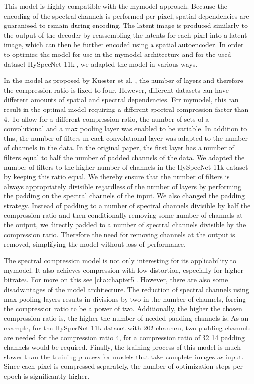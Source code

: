 This model is highly compatible with the \ac{mymodel} approach. Because the encoding of the spectral channels is performed per pixel, spatial dependencies are guaranteed to remain during encoding. The latent image is produced similarly to the output of the decoder by reassembling the latents for each pixel into a latent image, which can then be further encoded using a spatial autoencoder. In order to optimize the model for use in the \ac{mymodel} architecture and for the used dataset HySpecNet-11k \citep{fuchs_hyspecnet-11k_2023}, we adapted the model in various ways.

In the model as proposed by Kuester et al. \citep{kuester_1d-convolutional_2021,kuester_transferability_2022}, the number of layers and therefore the compression ratio is fixed to four. However, different datasets can have different amounts of spatial and spectral dependencies. For \ac{mymodel}, this can result in the optimal model requiring a different spectral compression factor than 4. To allow for a different compression ratio, the number of sets of a convolutional and a max pooling layer was enabled to be variable. In addition to this, the number of filters in each convolutional layer was adapted to the number of channels in the data. In the original paper, the first layer has a number of filters equal to half the number of padded channels of the data. We adapted the number of filters to the higher number of channels in the HySpecNet-11k dataset by keeping this ratio equal. We thereby ensure that the number of filters is always appropriately divisible regardless of the number of layers by performing the padding on the spectral channels of the input. We also changed the padding strategy. Instead of padding to a number of spectral channels divisible by half the compression ratio and then conditionally removing some number of channels at the output, we directly padded to a number of spectral channels divisible by the compression ratio. Therefore the need for removing channels at the output is removed, simplifying the model without loss of performance.

The spectral compression model is not only interesting for its applicability to \ac{mymodel}. It also achieves compression with low distortion, especially for higher bitrates. For more on this see \autoref{cha:chapter5}. However, there are also some disadvantages of the model architecture. The reduction of spectral channels using max pooling layers results in divisions by two in the number of channels, forcing the compression ratio to be a power of two. Additionally, the higher the chosen compression ratio is, the higher the number of needed padding channels is. As an example, for the HySpecNet-11k dataset with 202 channels, two padding channels are needed for the compression ratio 4, for a compression ratio of 32 14 padding channels would be required. Finally, the training process of this model is much slower than the training process for models that take complete images as input. Since each pixel is compressed separately, the number of optimization steps per epoch is significantly higher.
